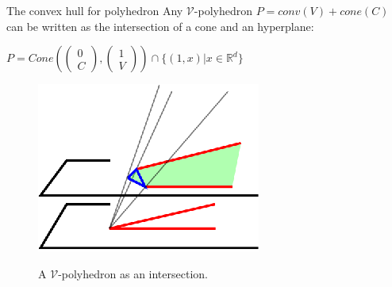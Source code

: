 \begin{frame}{The convex hull for polyhedron}
Any $\mathcal{V}$-polyhedron $P=conv(V)+cone(C)$ can be written as the intersection of a cone and an hyperplane:

$P=Cone\left(
 \begin{pmatrix}
 0 \\
 C 
 \end{pmatrix},
 \begin{pmatrix}
 1 \\
 V 
 \end{pmatrix}\right) \cap \{(1,x)|x\in\mathbb{R}^d\}$
 
 
\begin{figure}
\includegraphics[scale=1.5]{images/projection.eps}

A $\mathcal{V}$-polyhedron as an intersection.
\end{figure}
\end{frame}

